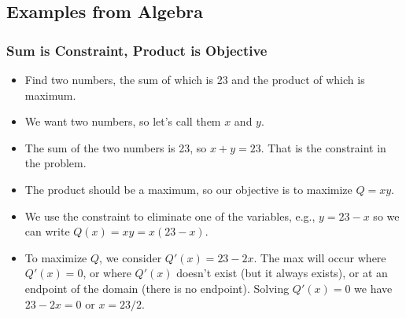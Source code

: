\documentclass[serif,ignorenonframetext]{beamer}
\begin{document}
\subsection{Examples from Algebra}

\begin{frame}
  \frametitle{Sum is Constraint, Product is Objective}
  \begin{itemize}[<+->]
  \item Find two numbers, the sum of which is 23 and the product of which
    is maximum.
  \item We want two numbers, so let's call them $x$ and $y$.
  \item The sum of the two numbers is 23, so $x+y=23$.  That is the 
    constraint in the problem.
  \item The product should be a maximum, so our objective is to maximize
    $Q=xy$.
  \item We use the constraint to eliminate one of the variables, e.g.,
    $y=23-x$ so we can write $Q(x)=xy=x(23-x)$.
  \item To maximize $Q$, we consider $Q'(x)=23-2x$.  The max will occur
    where $Q'(x)=0$, or where $Q'(x)$ doesn't exist (but it always
    exists), or at an endpoint
    of the domain (there is no endpoint).  Solving $Q'(x)=0$ we have
    $23-2x=0$ or $x=23/2$.
  \end{itemize}
\end{frame}
\end{document}
